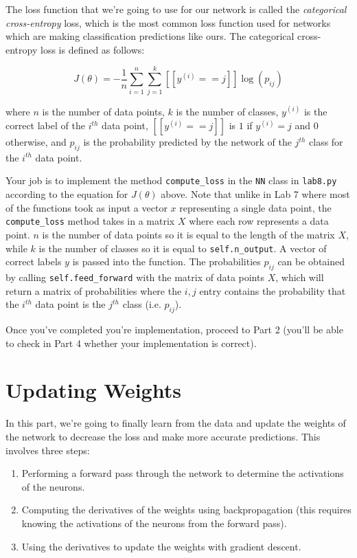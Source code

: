 \documentclass{article}
\begin{document}
The loss function that we're going to use for our network is called the \textit{categorical cross-entropy} loss, which is the most common loss function used for networks which are making classification predictions like ours. The categorical cross-entropy loss is defined as follows:

$$J(\theta) = -\frac{1}{n} \sum_{i=1}^n \sum_{j=1}^k [[y^{(i)} == j]] \log(p_{ij})$$

\noindent
where $n$ is the number of data points, $k$ is the number of classes, $y^{(i)}$ is the correct label of the $i^{th}$ data point, $[[y^{(i)} == j]]$ is $1$ if $y^{(i)} = j$ and $0$ otherwise, and $p_{ij}$ is the probability predicted by the network of the $j^{th}$ class for the $i^{th}$ data point.

Your job is to implement the method \texttt{compute\_loss} in the \texttt{NN} class in \texttt{lab8.py} according to the equation for $J(\theta)$ above. Note that unlike in Lab 7 where most of the functions took as input a vector $x$ representing a single data point, the \texttt{compute\_loss} method takes in a matrix $X$ where each row represents a data point. $n$ is the number of data points so it is equal to the length of the matrix $X$, while $k$ is the number of classes so it is equal to \texttt{self.n\_output}. A vector of correct labels $y$ is passed into the function. The probabilities $p_{ij}$ can be obtained by calling \texttt{self.feed\_forward} with the matrix of data points $X$, which will return a matrix of probabilities where the $i,j$ entry contains the probability that the $i^{th}$ data point is the $j^{th}$ class (i.e. $p_{ij}$).

Once you've completed you're implementation, proceed to Part 2 (you'll be able to check in Part 4 whether your implementation is correct).

\section{Updating Weights}

In this part, we're going to finally learn from the data and update the weights of the network to decrease the loss and make more accurate predictions. This involves three steps: 

\begin{enumerate}
    \item Performing a forward pass through the network to determine the activations of the neurons.
    \item Computing the derivatives of the weights using backpropagation (this requires knowing the activations of the neurons from the forward pass).
    \item Using the derivatives to update the weights with gradient descent.
\end{enumerate}
\end{document}
